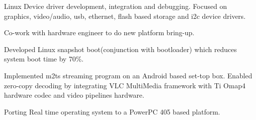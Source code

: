 \documentclass[a4paper]{deedy-resume} %
\begin{document}
\begin{minipage}[t]{0.66\textwidth}
\begin{tightitemize}
\item Linux Device driver development, integration and debugging. Focused on graphics, video/audio, usb, ethernet, flash based storage and i2c device drivers.
\item Co-work with hardware engineer to do new platform bring-up.
\item Developed Linux snapshot boot(conjunction with bootloader) which reduces system boot time by 70\%.
\item Implemented m2ts streaming program on an Android based set-top box. Enabled zero-copy decoding by integrating VLC MultiMedia framework with Ti Omap4 hardware codec and video pipelines hardware.
\item Porting Real time operating system to a PowerPC 405 based platform.
\end{tightitemize}

\sectionspace %

\end{minipage} %





\end{document}
